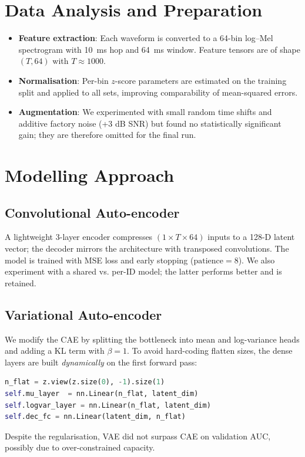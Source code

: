 \documentclass[11pt,a4paper]{article}
\begin{document}
\section{Data Analysis and Preparation}
\begin{itemize}
  \item \textbf{Feature extraction}: Each waveform is converted to a 64-bin log–Mel spectrogram with 10~ms hop and 64~ms window.  Feature tensors are of shape $(T,64)$ with $T\approx1000$.
  \item \textbf{Normalisation}: Per-bin $z$-score parameters are estimated on the training split and applied to all sets, improving comparability of mean-squared errors.
  \item \textbf{Augmentation}: We experimented with small random time shifts and additive factory noise (+3 dB SNR) but found no statistically significant gain; they are therefore omitted for the final run.
\end{itemize}

\section{Modelling Approach}
\subsection{Convolutional Auto-encoder}
A lightweight 3-layer encoder compresses $(1\times T\times64)$ inputs to a 128-D latent vector; the decoder mirrors the architecture with transposed convolutions.  The model is trained with MSE loss and early stopping ($\text{patience}=8$).  We also experiment with a shared vs. per-ID model; the latter performs better and is retained.

\subsection{Variational Auto-encoder}
We modify the CAE by splitting the bottleneck into mean and log-variance heads and adding a KL term with $\beta=1$.  To avoid hard-coding flatten sizes, the dense layers are built \emph{dynamically} on the first forward pass:\newline
\begin{lstlisting}[language=Python]
n_flat = z.view(z.size(0), -1).size(1)
self.mu_layer  = nn.Linear(n_flat, latent_dim)
self.logvar_layer = nn.Linear(n_flat, latent_dim)
self.dec_fc = nn.Linear(latent_dim, n_flat)
\end{lstlisting}
Despite the regularisation, VAE did not surpass CAE on validation AUC, possibly due to over-constrained capacity.
\end{document}
